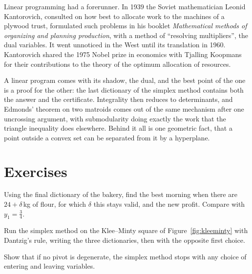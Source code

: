 \begin{remark}
Linear programming had a forerunner. In 1939 the Soviet mathematician Leonid Kantorovich, consulted on how best to allocate work to the machines of a plywood trust, formulated such problems in his booklet \emph{Mathematical methods of organizing and planning production},
with a method of ``resolving multipliers'', the dual variables. It went unnoticed in the West until its translation in 1960. Kantorovich shared the 1975 Nobel prize in economics with Tjalling Koopmans for their contributions to the theory of the optimum allocation of resources.
\end{remark}

\begin{beauty}
A linear program comes with its shadow, the dual, and the best point of the one is a proof for the other: the last dictionary of the simplex method contains both the answer and the certificate. Integrality then reduces to determinants, and Edmonds' theorem
on two matroids comes out of the same mechanism after one uncrossing argument, with submodularity doing exactly the work that the triangle inequality does elsewhere. Behind it all is one geometric fact, that a point outside a convex set can be separated from it by a hyperplane.
\end{beauty}

\section{Exercises}

\begin{exercise}[$\star$]\label{ex:bakerydual}
Using the final dictionary of the bakery, find the best morning when there are $24+\delta$\,kg of flour, for which $\delta$ this stays valid, and the new profit. Compare with $y_1=\tfrac34$.
\end{exercise}

\begin{exercise}[$\star$]\label{ex:kleeminty}
Run the simplex method on the Klee--Minty square of Figure~\ref{fig:kleeminty} with Dantzig's rule, writing the three dictionaries, then with the opposite first choice.
\end{exercise}

\begin{exercise}[$\star$]\label{ex:degenerate}
Show that if no pivot is degenerate, the simplex method stops with any choice of entering and leaving variables.
\end{exercise}

